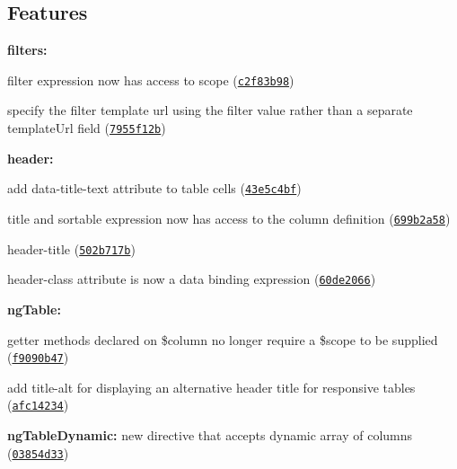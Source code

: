 \subsection*{Features}


\begin{DoxyItemize}
\item {\bfseries filters\+:}
\begin{DoxyItemize}
\item filter expression now has access to scope (\href{https://github.com/esvit/ng-table/commit/c2f83b9877b23b0124885b2cd9ab1fc705970f49}{\tt c2f83b98})
\item specify the filter template url using the filter value rather than a separate template\+Url field (\href{https://github.com/esvit/ng-table/commit/7955f12ba96eb8a5f047484d83f3c53a2954f1db}{\tt 7955f12b})
\end{DoxyItemize}
\item {\bfseries header\+:}
\begin{DoxyItemize}
\item add data-\/title-\/text attribute to table cells (\href{https://github.com/esvit/ng-table/commit/43e5c4bf03bfca2d5dd71d6dcfeb3f318fcfd692}{\tt 43e5c4bf})
\item title and sortable expression now has access to the column definition (\href{https://github.com/esvit/ng-table/commit/699b2a58aeb6a85ff2ad5a4cbc70728de2b7f2fe}{\tt 699b2a58})
\item header-\/title (\href{https://github.com/esvit/ng-table/commit/502b717be88d38b75ef3be7e29da5a5da71bf5eb}{\tt 502b717b})
\item header-\/class attribute is now a data binding expression (\href{https://github.com/esvit/ng-table/commit/60de2066b9be1a33210767783354c11004d5e042}{\tt 60de2066})
\end{DoxyItemize}
\item {\bfseries ng\+Table\+:}
\begin{DoxyItemize}
\item getter methods declared on \$column no longer require a \$scope to be supplied (\href{https://github.com/esvit/ng-table/commit/f9090b47981105bb59928cc6eeb8bc1499b6d5ab}{\tt f9090b47})
\item add title-\/alt for displaying an alternative header title for responsive tables (\href{https://github.com/esvit/ng-table/commit/afc142345aadc940ef913763fe86dc798a80f750}{\tt afc14234})
\end{DoxyItemize}
\item {\bfseries ng\+Table\+Dynamic\+:} new directive that accepts dynamic array of columns (\href{https://github.com/esvit/ng-table/commit/03854d333d35fb7ebae53847c937ec45f3f58eb7}{\tt 03854d33})
\end{DoxyItemize}

